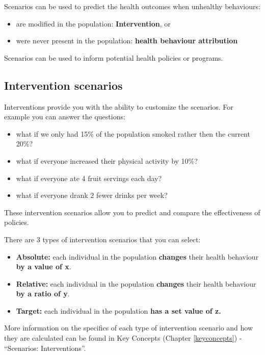 \documentclass[]{book}
\providecommand{\tightlist}{%
  \setlength{\itemsep}{0pt}\setlength{\parskip}{0pt}}
\begin{document}
Scenarios can be used to predict the health outcomes when unhealthy
behaviours:

\begin{itemize}
\tightlist
\item
  are modified in the population: \textbf{Intervention}, or
\item
  were never present in the population: \textbf{health behaviour
  attribution}
\end{itemize}

Scenarios can be used to inform potential health policies or programs.

\subsection{Intervention scenarios}\label{intervention-scenarios}

Interventions provide you with the ability to customize the scenarios.
For example you can answer the questions:

\begin{itemize}
\tightlist
\item
  what if we only had 15\% of the population smoked rather then the
  current 20\%?
\item
  what if everyone increased their physical activity by 10\%?
\item
  what if everyone ate 4 fruit servings each day?
\item
  what if everyone drank 2 fewer drinks per week?
\end{itemize}

These intervention scenarios allow you to predict and compare the
effectiveness of policies.

There are 3 types of intervention scenarios that you can select:

\begin{itemize}
\tightlist
\item
  \textbf{Absolute:} each individual in the population \textbf{changes}
  their health behaviour \textbf{by a value of x}.
\item
  \textbf{Relative:} each individual in the population \textbf{changes}
  their health behaviour \textbf{by a ratio of y}.
\item
  \textbf{Target:} each individual in the population \textbf{has a set
  value of z.}
\end{itemize}

More information on the specifics of each type of intervention scenario
and how they are calculated can be found in Key Concepts (Chapter
\ref{keyconcepts}) - ``Scenarios: Interventions''.
\end{document}
